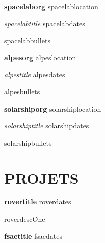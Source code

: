 \documentclass[10pt,a4paper]{article}
\newcommand{\projectOne}{rover}
\newcommand{\projectTwo}{fsae}
\newcommand{\jobOne}{spacelab}
\newcommand{\jobTwo}{alpes}
\newcommand{\jobFour}{solarship}
\newcommand{\get}[2]{\csname #1#2\endcsname}
\begin{document}
\textbf{\get{\jobOne}{org}} \hfill \get{\jobOne}{location}

\textit{\get{\jobOne}{title}} \hfill \get{\jobOne}{dates}

\begin{itemize}
    \get{\jobOne}{bullets}
\end{itemize}


\vspace{2pt}

\textbf{\get{\jobTwo}{org}} \hfill \get{\jobTwo}{location}

\textit{\get{\jobTwo}{title}} \hfill \get{\jobTwo}{dates}

\begin{itemize}
    \get{\jobTwo}{bullets}
\end{itemize}

\vspace{2pt}





\textbf{\get{\jobFour}{org}} \hfill \get{\jobFour}{location}

\textit{\get{\jobFour}{title}} \hfill \get{\jobFour}{dates}

\begin{itemize}
    \get{\jobFour}{bullets}
\end{itemize}

\vspace{2pt}



\hrulefill 
\section*{PROJETS}

\textbf{\get{\projectOne}{title}} \hfill \get{\projectOne}{dates}

\get{\projectOne}{descOne}

\vspace{4pt}

\textbf{\get{\projectTwo}{title}} \hfill \get{\projectTwo}{dates}
\end{document}
